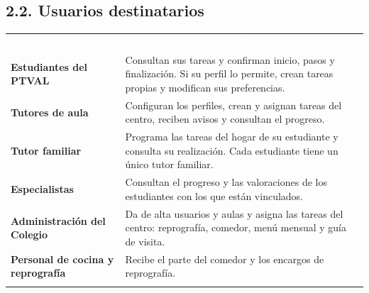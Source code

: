 \documentclass[11pt,a4paper]{article}
\newcommand{\hl}[1]{\textcolor{gblue}{\textbf{#1}}}
\begin{document}
\subsection*{2.2. Usuarios destinatarios}
{\small\par\noindent\begin{tabular}{@{}>{\raggedright\arraybackslash}p{}>{\raggedright\arraybackslash}p{}@{}}
\rowcolor{gblue}\textcolor{white}{\textbf{Usuario}} & \textcolor{white}{\textbf{Qué hace con TuAgendita}} \\
\hl{Estudiantes del PTVAL} & Consultan sus tareas y confirman inicio, pasos y finalización. Si su perfil lo permite, crean tareas propias y modifican sus preferencias. \\ \arrayrulecolor{gline}\hline
\rowcolor{glight}
\hl{Tutores de aula} & Configuran los perfiles, crean y asignan tareas del centro, reciben avisos y consultan el progreso. \\ \arrayrulecolor{gline}\hline
\hl{Tutor familiar} & Programa las tareas del hogar de su estudiante y consulta su realización. Cada estudiante tiene un único tutor familiar. \\ \arrayrulecolor{gline}\hline
\rowcolor{glight}
\hl{Especialistas} & Consultan el progreso y las valoraciones de los estudiantes con los que están vinculados. \\ \arrayrulecolor{gline}\hline
\hl{Administración del Colegio} & Da de alta usuarios y aulas y asigna las tareas del centro: reprografía, comedor, menú mensual y guía de visita. \\ \arrayrulecolor{gline}\hline
\rowcolor{glight}
\hl{Personal de cocina y reprografía} & Recibe el parte del comedor y los encargos de reprografía. \\ \arrayrulecolor{gline}\hline
\end{tabular}\par}\medskip

\end{document}
